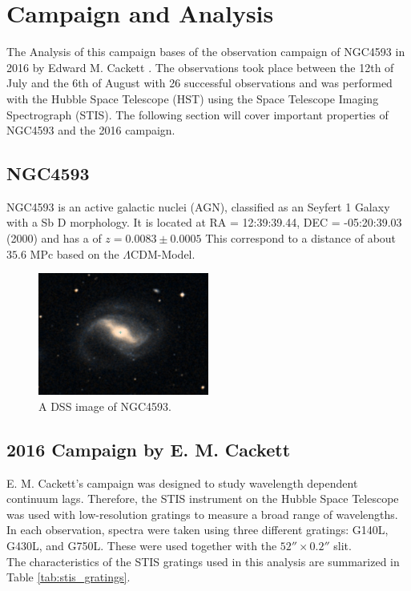 \chapter{Campaign and Analysis}
\label{campaign_and_analysis}
The Analysis of this campaign bases of the observation campaign of NGC4593 in 2016 by Edward M. Cackett \parencite{cackett2018accretion}. The observations took place between the 12th of July and the 6th of August with 26 successful observations and was performed with the Hubble Space Telescope (HST) using the Space Telescope Imaging Spectrograph (STIS). The following section will cover important properties of NGC4593 and the 2016 campaign.

\section{NGC4593}
\label{NGC4593}

NGC4593 is an active galactic nuclei (AGN), classified as an Seyfert 1 Galaxy with a Sb D morphology.  It is located at RA = 12:39:39.44, DEC = -05:20:39.03 (2000) and has a of $ z = 0.0083 \pm 0.0005$ This correspond to a distance of about $35.6$ MPc \parencite{simbaNGC4593}based on the $\Lambda$CDM-Model. 

\begin{figure}[!ht]
	\centering
	\includegraphics[width=0.5\textwidth]{pictures/Chapter2/NGC4593.PNG}
	\caption{A DSS image of NGC4593.}
	\label{fig:NGC4593}
\end{figure}

\section{2016 Campaign by E. M. Cackett}
\label{Campaign_Cackett}

E. M. Cackett's campaign was designed to study wavelength dependent continuum lags. Therefore, the STIS instrument on the Hubble Space Telescope was used with low-resolution gratings to measure a broad range of wavelengths. In each observation, spectra were taken using three different gratings: G140L, G430L, and G750L. These were used together with the $52'' \times 0.2''$ slit.\\
The characteristics of the STIS gratings used in this analysis are summarized in Table \ref{tab:stis_gratings}.

